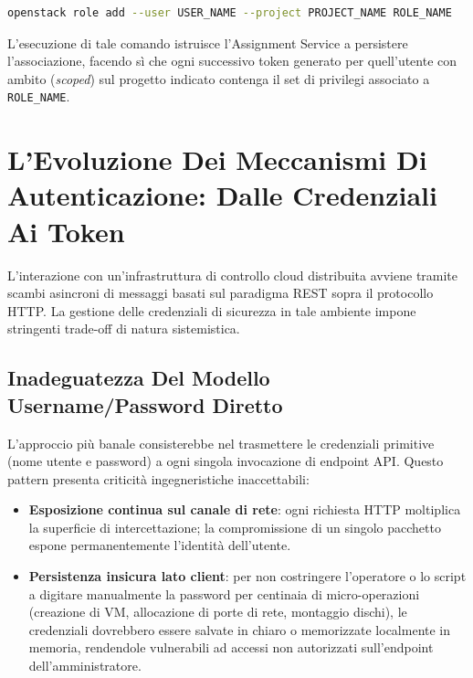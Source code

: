 \documentclass[11pt, a4paper]{article}
\begin{document}
\begin{lstlisting}[language=bash]
openstack role add --user USER_NAME --project PROJECT_NAME ROLE_NAME
\end{lstlisting}

L'esecuzione di tale comando istruisce l'Assignment Service a persistere l'associazione, facendo sì che ogni successivo token generato per quell'utente con ambito (\emph{scoped}) sul progetto indicato contenga il set di privilegi associato a \texttt{ROLE\_NAME}.


\section{L'Evoluzione Dei Meccanismi Di Autenticazione: Dalle Credenziali Ai Token}

L'interazione con un'infrastruttura di controllo cloud distribuita avviene tramite scambi asincroni di messaggi basati sul paradigma REST sopra il protocollo HTTP. La gestione delle credenziali di sicurezza in tale ambiente impone stringenti trade-off di natura sistemistica.

\subsection{Inadeguatezza Del Modello Username/Password Diretto}

L'approccio più banale consisterebbe nel trasmettere le credenziali primitive (nome utente e password) a ogni singola invocazione di endpoint API. Questo pattern presenta criticità ingegneristiche inaccettabili:
\begin{itemize}[noitemsep]
    \item \textbf{Esposizione continua sul canale di rete}: ogni richiesta HTTP moltiplica la superficie di intercettazione; la compromissione di un singolo pacchetto espone permanentemente l'identità dell'utente.
    \item \textbf{Persistenza insicura lato client}: per non costringere l'operatore o lo script a digitare manualmente la password per centinaia di micro-operazioni (creazione di VM, allocazione di porte di rete, montaggio dischi), le credenziali dovrebbero essere salvate in chiaro o memorizzate localmente in memoria, rendendole vulnerabili ad accessi non autorizzati sull'endpoint dell'amministratore.
\end{itemize}
\end{document}
